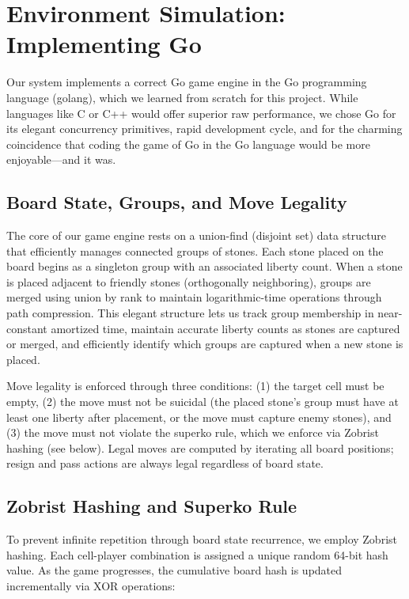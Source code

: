 \documentclass[12pt]{article}
\begin{document}
\section{Environment Simulation: Implementing Go}

Our system implements a correct Go game engine in the Go programming language (golang), which we learned from scratch for this project. While languages like C or C++ would offer superior raw performance, we chose Go for its elegant concurrency primitives, rapid development cycle, and for the charming coincidence that coding the game of Go in the Go language would be more enjoyable—and it was.

\subsection{Board State, Groups, and Move Legality}

The core of our game engine rests on a union-find (disjoint set) data structure that efficiently manages connected groups of stones. Each stone placed on the board begins as a singleton group with an associated liberty count. When a stone is placed adjacent to friendly stones (orthogonally neighboring), groups are merged using union by rank to maintain logarithmic-time operations through path compression. This elegant structure lets us track group membership in near-constant amortized time, maintain accurate liberty counts as stones are captured or merged, and efficiently identify which groups are captured when a new stone is placed.

Move legality is enforced through three conditions: (1) the target cell must be empty, (2) the move must not be suicidal (the placed stone's group must have at least one liberty after placement, or the move must capture enemy stones), and (3) the move must not violate the superko rule, which we enforce via Zobrist hashing (see below). Legal moves are computed by iterating all board positions; resign and pass actions are always legal regardless of board state.

\subsection{Zobrist Hashing and Superko Rule}

To prevent infinite repetition through board state recurrence, we employ Zobrist hashing. Each cell-player combination is assigned a unique random 64-bit hash value. As the game progresses, the cumulative board hash is updated incrementally via XOR operations:
\end{document}

